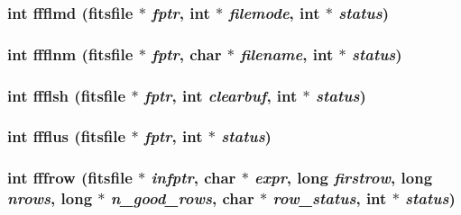 \subsubsection{\setlength{\rightskip}{0pt plus 5cm}int ffflmd (\bf{fitsfile} $\ast$ {\em fptr}, int $\ast$ {\em filemode}, int $\ast$ {\em status})}\label{test_2shm__client_2fitsio_8h_b40add552ca38d7ad3adcaa46ed38eb4}


\subsubsection{\setlength{\rightskip}{0pt plus 5cm}int ffflnm (\bf{fitsfile} $\ast$ {\em fptr}, char $\ast$ {\em filename}, int $\ast$ {\em status})}\label{test_2shm__client_2fitsio_8h_24ea04fea8050162c7c98d944d4f4a5d}


\subsubsection{\setlength{\rightskip}{0pt plus 5cm}int ffflsh (\bf{fitsfile} $\ast$ {\em fptr}, int {\em clearbuf}, int $\ast$ {\em status})}\label{test_2shm__client_2fitsio_8h_be4e54a1daa5329c828b6ad9b3bb9a76}


\subsubsection{\setlength{\rightskip}{0pt plus 5cm}int ffflus (\bf{fitsfile} $\ast$ {\em fptr}, int $\ast$ {\em status})}\label{test_2shm__client_2fitsio_8h_dfee4024f70912aaaf7a9cae405114da}


\subsubsection{\setlength{\rightskip}{0pt plus 5cm}int fffrow (\bf{fitsfile} $\ast$ {\em infptr}, char $\ast$ {\em expr}, long {\em firstrow}, long {\em nrows}, long $\ast$ {\em n\_\-good\_\-rows}, char $\ast$ {\em row\_\-status}, int $\ast$ {\em status})}\label{test_2shm__client_2fitsio_8h_1fc72ca968d2f0b3c5ccbe7bc1f96ff2}


